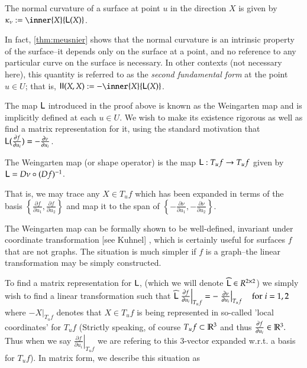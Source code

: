 	\begin{defn}
		The normal curvature of a surface at point $u$ in the direction $X$ is given by $\kappa_\nu :=  \inner{X}{\wein(X)}$.
	\end{defn}
	In fact, \cref{thm:meusnier} shows that the normal curvature is an intrinsic property of the surface--it depends only on the
	surface at a point, and no reference to any particular curve on the surface is necessary.
	In other contexts (not necessary here), this quantity is referred to as the \textit{second fundamental form} at the point $u \in U$; that is, $ \mathbf{II}(X,X) := - \inner{X}{\wein(X)}$.
	
	
	The map $\mathsf{L}$ introduced in the proof above is known as the Weingarten map
	and is implicitly defined at each $u \in U$. 
	We wish to make its existence rigorous as well as find a matrix representation for it, using the standard motivation that $\mathsf{L}(\frac{\partial f}{\partial u_i}) = - \frac{\partial \nu}{\partial u_i}$.
	

	\begin{defn}
	The Weingarten map (or shape operator) is the map $\mathsf{L}: T_u f \to T_u f$ given by
	$\mathsf{L} = D\nu \circ (Df)^{-1}$.
	\end{defn}
	
	
	That is, we may trace any $X \in T_u f$ which has been expanded in terms of the basis 
	$\left\{\frac{\partial f}{\partial u_1} , \frac{\partial f}{\partial u_2}\right\}$
	and map it to the span of $\left\{-\frac{\partial \nu}{\partial u_1} , -\frac{\partial \nu}{\partial u_2}\right\}$. 
	
	The Weingarten map can be formally shown to be well-defined, invariant under coordinate transformation [see Kuhnel] , which is certainly useful for surfaces $f$ that are not graphs. The situation is much simpler if $f$ is a graph--the linear transformation may be simply constructed.		
	
	To find a matrix representation for $\mathsf{L}$, (which we will denote $\widehat{\mathsf{L}} \in R^{2\times2}$) we simply wish to find a linear transformation
	such that
	$\widehat{\mathsf{L}} \left.\frac{\partial f}{\partial u_i}\right|_{T_u f}
		= - \left.\frac{\partial \nu}{\partial u_i}\right|_{T_u f} \quad \textrm{for} \; i=1,2$
			where $- \left.X\right|_{T_u f}$ denotes that $X \in T_u f$ is being represented in so-called
	'local coordinates' for $T_u f$ (Strictly speaking, of course $T_u f \subset \mathbb{R}^3$ and thus
	$\frac{\partial f}{\partial u_i} \in \mathbb{R}^3.$ Thus when we say $ \left.\frac{\partial f}{\partial u_i}\right|_{T_u f}$ we are refering to this 3-vector expanded w.r.t. a basis for $T_u f$). In matrix form, we describe this situation as
	
